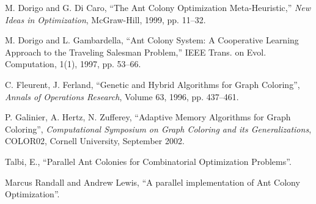 \documentclass[11pt]{article}
\begin{document}
\begin{thebibliography}{99}






M. Dorigo and G. Di Caro,
``The Ant Colony Optimization Meta-Heuristic,''
{\it New Ideas in Optimization}, McGraw-Hill, 1999, pp. 11--32.


M. Dorigo and L. Gambardella,
``Ant Colony System: A Cooperative Learning Approach to the Traveling
Salesman Problem,''
IEEE Trans. on Evol. Computation, 1(1), 1997, pp. 53--66.

C. Fleurent, J. Ferland,
``Genetic and Hybrid Algorithms for Graph Coloring'',
{\it Annals of Operations Research}, Volume 63, 1996, pp. 437--461.

P. Galinier, A. Hertz, N. Zufferey,
``Adaptive Memory Algorithms for Graph Coloring'',
{\it Computational Symposium on Graph Coloring and its Generalizations}, 
COLOR02,
Cornell University, September 2002.

Talbi, E., ``Parallel Ant Colonies for Combinatorial Optimization Problems''.

Marcus Randall and Andrew Lewis, ``A parallel implementation of Ant Colony Optimization''.





\end{thebibliography}
\end{document}
